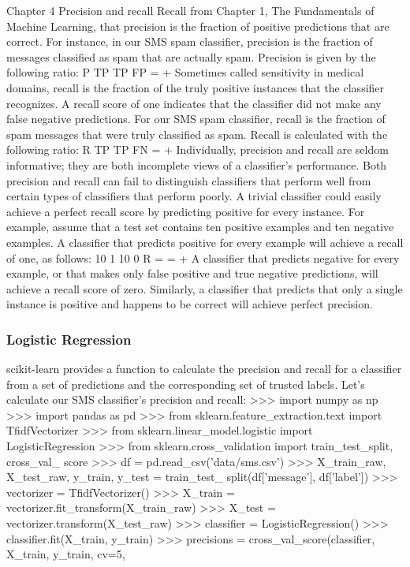 \begin{frame}
\begin{frame}
\begin{frame}
\begin{frame}
\begin{frame}
\begin{frame}
\begin{frame}
Chapter 4
Precision and recall
Recall from Chapter 1, The Fundamentals of Machine Learning, that precision is the
fraction of positive predictions that are correct. For instance, in our SMS spam
classifier, precision is the fraction of messages classified as spam that are actually
spam. Precision is given by the following ratio:
P TP
TP FP
=
+
Sometimes called sensitivity in medical domains, recall is the fraction of the truly
positive instances that the classifier recognizes. A recall score of one indicates
that the classifier did not make any false negative predictions. For our SMS spam
classifier, recall is the fraction of spam messages that were truly classified as spam.
Recall is calculated with the following ratio:
R TP
TP FN
=
+
Individually, precision and recall are seldom informative; they are both incomplete
views of a classifier's performance. Both precision and recall can fail to distinguish
classifiers that perform well from certain types of classifiers that perform poorly. A
trivial classifier could easily achieve a perfect recall score by predicting positive for
every instance. For example, assume that a test set contains ten positive examples
and ten negative examples. A classifier that predicts positive for every example will
achieve a recall of one, as follows:
10 1
10 0
R = =
+
A classifier that predicts negative for every example, or that makes only false positive
and true negative predictions, will achieve a recall score of zero. Similarly, a classifier
that predicts that only a single instance is positive and happens to be correct will
achieve perfect precision.
\begin{frame}\frametitle{Logistic Regression}
scikit-learn provides a function to calculate the precision and recall for a classifier
from a set of predictions and the corresponding set of trusted labels. Let's calculate
our SMS classifier's precision and recall:
>>> import numpy as np
>>> import pandas as pd
>>> from sklearn.feature_extraction.text import TfidfVectorizer
>>> from sklearn.linear_model.logistic import LogisticRegression
>>> from sklearn.cross_validation import train_test_split, cross_val_
score
>>> df = pd.read_csv('data/sms.csv')
>>> X_train_raw, X_test_raw, y_train, y_test = train_test_
split(df['message'], df['label'])
>>> vectorizer = TfidfVectorizer()
>>> X_train = vectorizer.fit_transform(X_train_raw)
>>> X_test = vectorizer.transform(X_test_raw)
>>> classifier = LogisticRegression()
>>> classifier.fit(X_train, y_train)
>>> precisions = cross_val_score(classifier, X_train, y_train, cv=5,

\end{frame}
\end{frame}
\end{frame}
\end{frame}
\end{frame}
\end{frame}
\end{frame}
\end{frame}
